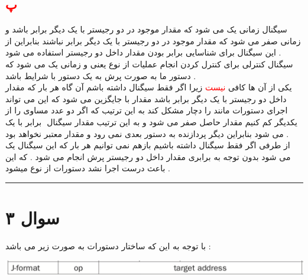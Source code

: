 \documentclass{article}
\begin{document}
\subsection*{\textcolor{red}{پ}}
 سیگنال 
زمانی یک می شود که مقدار موجود در دو رجیستر با یک دیگر برابر باشد و زمانی صفر می شود که مقدار موجود در دو رجیستر با یک دیگر برابر نباشند بنابراین از این سیگنال برای شناسایی برابر بودن مقدار داخل دو رجیستر استفاده می شود  . 
\\
سیگنال کنترلی 
برای کنترل کردن انجام عملیات از نوع
یعنی 
و زمانی یک می شود که دستور ما به صورت پرش به یک دستور با شرایط باشد  .
\\
یکی از آن ها کافی 
\textcolor{red}{نیست}
زیرا اگر فقط سیگنال
داشته باشم آن گاه هر بار که مقدار داخل دو رجیستر با یک دیگر برابر باشد مقدار 
با
جایگزین می شود که این می تواند اجرای  دستورات مانند 
را دچار مشکل کند به این ترتیب که اگر دو عدد مساوی را از یکدیگر کم کنیم مقدار حاصل صفر می شود و به این ترتیب مقدار سیگنال 
‌
برابر با یک می شود بنابراین دیگر پردازنده به دستور بعدی نمی رود و مقدار 
معتبر نخواهد بود . 
\\
از طرفی اگر فقط سیگنال 
داشته باشیم بازهم نمی توانیم هر بار که این سیگنال یک می شود بدون توجه به برابری مقدار داخل دو رجیستر پرش انجام می شود  . که این باعث درست اجرا نشد دستورات از نوع 
میشود . 
\hrule
\section*{سوال ۳}
با توجه به این که ساختار دستورات 
به صورت زیر می باشد  : 
\begin{center}
	\includegraphics[width=1\textwidth]{jtype}
\end{center}
\end{document}
